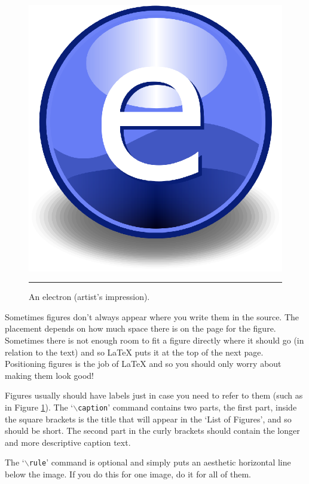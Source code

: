 \begin{figure}[htbp]
	\centering
		\includegraphics{Figures/Electron.eps}
		\rule{35em}{0.5pt}
	\caption[An Electron]{An electron (artist's impression).}
	\label{fig:Electron}
\end{figure}

Sometimes figures don't always appear where you write them in the source. The placement depends on how much space there is on the page for the figure. Sometimes there is not enough room to fit a figure directly where it should go (in relation to the text) and so \LaTeX{} puts it at the top of the next page. Positioning figures is the job of \LaTeX{} and so you should only worry about making them look good!

Figures usually should have labels just in case you need to refer to them (such as in Figure \ref{fig:Electron}). The `$\backslash$\texttt{caption}' command contains two parts, the first part, inside the square brackets is the title that will appear in the `List of Figures', and so should be short. The second part in the curly brackets should contain the longer and more descriptive caption text.

The `$\backslash$\texttt{rule}' command is optional and simply puts an aesthetic horizontal line below the image. If you do this for one image, do it for all of them.

